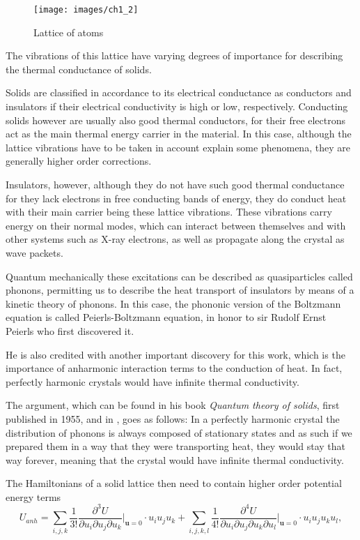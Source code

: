 \begin{figure}[htpb]
	\centering
	\texttt{[image: images/ch1\_2]}
	\caption{Lattice of atoms}
	\label{fig:ch1_2}
\end{figure}

The vibrations of this lattice have varying degrees of importance for describing the thermal conductance of solids. 

Solids are classified in accordance to its electrical conductance as conductors and insulators if their electrical conductivity is high or low, respectively. Conducting solids however are usually also good thermal conductors, for their free electrons act as the main thermal energy carrier in the material. In this case, although the lattice vibrations have to be taken in account explain some phenomena, they are generally higher order corrections.

Insulators, however, although they do not have such good thermal conductance for they lack electrons in free conducting bands of energy, they do conduct heat with their main carrier being these lattice vibrations. These vibrations carry energy on their normal modes, which can interact between themselves and with other systems such as X-ray electrons, as well as propagate along the crystal as wave packets.

Quantum mechanically these excitations can be described as quasiparticles called phonons, permitting us to describe the heat transport of insulators by means of a kinetic theory of phonons. In this case, the phononic version of the Boltzmann equation is called Peierls-Boltzmann equation, in honor to sir Rudolf Ernst Peierls who first discovered it.

He is also credited with another important discovery for this work, which is the importance of anharmonic interaction terms to the conduction of heat. In fact, perfectly harmonic crystals would have infinite thermal conductivity.

The argument, which can be found in his book \textit{Quantum theory of solids}, first published in 1955, and in \cite{ashcroftSolidState1976}, goes as follows: In a perfectly harmonic crystal the distribution of phonons is always composed of stationary states and as such if we prepared them in a way that they were transporting heat, they would stay that way forever, meaning that the crystal would have infinite thermal conductivity.

The Hamiltonians of a solid lattice then need to contain higher order potential energy terms
\[ 
	U_{anh} = \sum_{i,j,k} 
	\frac{1 }{3! } 
	\frac{\partial^{3} U }{\partial u_{i}\partial u_{j}\partial u_{k}}
	\Biggr|_{\mathbf{u}=0}
	\cdot
	u_{i}u_{j}u_{k} 
	+ \sum_{i,j,k,l}
	\frac{1 }{4! } 
	\frac{\partial^{4} U }
	{\partial u_{i}\partial u_{j}\partial u_{k} \partial u_{l}}
	\Biggr|_{\mathbf{u}=0}
	\cdot u_{i}u_{j}u_{k}u_{l},
\]

